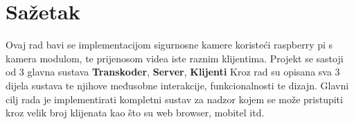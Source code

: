 \section{Sažetak}
Ovaj rad bavi se implementacijom sigurnosne kamere koristeći raspberry pi s kamera modulom, 
te prijenosom videa iste raznim klijentima.
\paraBreak
Projekt se sastoji od 3 glavna sustava \textbf{Transkoder}, \textbf{Server}, \textbf{Klijenti}
\paraBreak
Kroz rad su opisana sva 3 dijela sustava te njihove međusobne interakcije, funkcionalnosti te dizajn.
\paraBreak
Glavni cilj rada je implementirati kompletni sustav za nadzor kojem se može pristupiti kroz velik broj klijenata kao što su web browser, mobitel itd.
